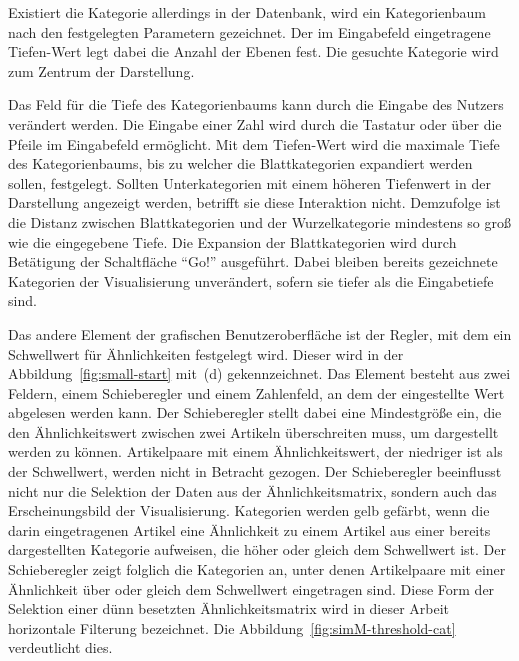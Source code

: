 Existiert die Kategorie allerdings in der Datenbank, wird ein Kategorienbaum nach den festgelegten Parametern gezeichnet.
Der im Eingabefeld eingetragene Tiefen-Wert legt dabei die Anzahl der Ebenen fest.
Die gesuchte Kategorie wird zum Zentrum der Darstellung.

Das Feld für die Tiefe des Kategorienbaums kann durch die Eingabe des Nutzers verändert werden.
Die Eingabe einer Zahl wird durch die Tastatur oder über die Pfeile im Eingabefeld ermöglicht.
Mit dem Tiefen-Wert wird die maximale Tiefe des Kategorienbaums, bis zu welcher die Blattkategorien expandiert werden sollen, festgelegt.
Sollten Unterkategorien mit einem höheren Tiefenwert in der Darstellung angezeigt werden, betrifft sie diese Interaktion nicht.
Demzufolge ist die Distanz zwischen Blattkategorien und der Wurzelkategorie mindestens so groß wie die eingegebene Tiefe.
Die Expansion der Blattkategorien wird durch Betätigung der Schaltfläche "`Go!"' ausgeführt.
Dabei bleiben bereits gezeichnete Kategorien der Visualisierung unverändert, sofern sie tiefer als die Eingabetiefe sind.

Das andere Element der grafischen Benutzeroberfläche ist der Regler, mit dem ein Schwellwert für Ähnlichkeiten festgelegt wird.
Dieser wird in der Abbildung~\ref{fig:small-start} mit~(d) gekennzeichnet.
Das Element besteht aus zwei Feldern, einem Schieberegler und einem Zahlenfeld, an dem der eingestellte Wert abgelesen werden kann.
Der Schieberegler stellt dabei eine Mindestgröße ein, die den Ähnlichkeitswert zwischen zwei Artikeln überschreiten muss, um dargestellt werden zu können.
Artikelpaare mit einem Ähnlichkeitswert, der niedriger ist als der Schwellwert, werden nicht in Betracht gezogen.
Der Schieberegler beeinflusst nicht nur die Selektion der Daten aus der Ähnlichkeitsmatrix, sondern auch das Erscheinungsbild der Visualisierung.
Kategorien werden gelb gefärbt, wenn die darin eingetragenen Artikel eine Ähnlichkeit zu einem Artikel aus einer bereits dargestellten Kategorie aufweisen, die höher oder gleich dem Schwellwert ist.
Der Schieberegler zeigt folglich die Kategorien an, unter denen Artikelpaare mit einer Ähnlichkeit über oder gleich dem Schwellwert eingetragen sind.
Diese Form der Selektion einer dünn besetzten Ähnlichkeitsmatrix wird in dieser Arbeit horizontale Filterung bezeichnet.
Die Abbildung~\ref{fig:simM-threshold-cat} verdeutlicht dies.

